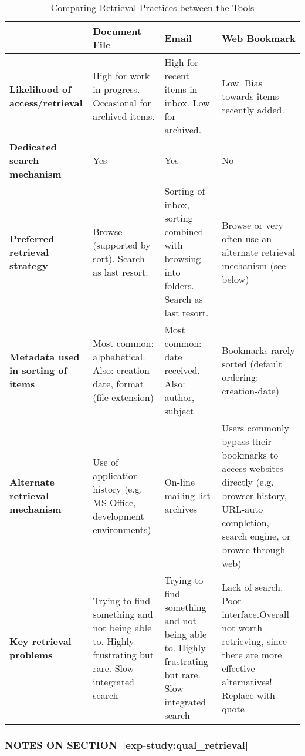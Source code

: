 \begin{table}[h]
\begin{center}
\begin{footnotesize}
\begin{tabular}{|p{2.5cm}|p{3.5cm}|p{3.5cm}|p{3.5cm}|}
\hline
    {\bf } & {\bf Document File} & {\bf Email} & {\bf Web Bookmark} \\
\hline \hline
{\bf Likelihood of access/retrieval} & High for work in progress. Occasional for archived items. & High for recent items in inbox. Low for archived. & Low. Bias towards items recently added. \\
\hline
{\bf Dedicated search mechanism} &        Yes &        Yes &         No \\
\hline
{\bf Preferred retrieval strategy} & Browse (supported by sort). Search as last resort. & Sorting of inbox, sorting combined with browsing into folders. Search as last resort. & Browse or very often use an alternate retrieval mechanism (see below) \\
\hline
{\bf Metadata used in sorting of items} & Most common: alphabetical. Also: creation-date, format (file extension) & Most common: date received.  Also: author, subject & Bookmarks rarely sorted (default ordering: creation-date) \\
\hline
{\bf Alternate retrieval mechanism} & Use of application history  (e.g. MS-Office, development environments) & On-line mailing list archives & Users commonly bypass their bookmarks to access websites directly (e.g. browser history, URL-auto completion, search engine, or browse through web) \\
\hline
{\bf Key retrieval problems} & Trying to find something and not being able to. Highly frustrating but rare. Slow integrated search & Trying to find something and not being able to. Highly frustrating but rare. Slow integrated search & Lack of search. Poor interface.Overall not worth retrieving, since there are more effective alternatives!  Replace with quote \\
\hline
\end{tabular}  
\end{footnotesize}
\caption{Comparing Retrieval Practices between the Tools}
\label{table:chapter3_retrieval_strategy}
\end{center}
\end{table}

\noindent
\subsubsection*{NOTES ON SECTION~\ref{exp-study:qual_retrieval}}

